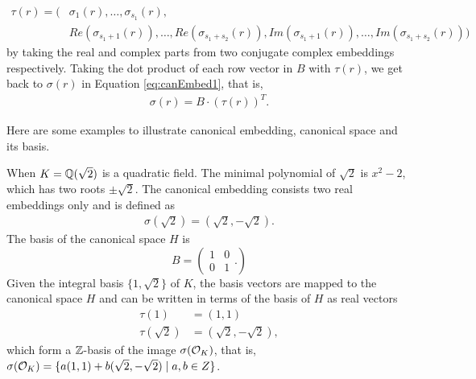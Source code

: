 \documentclass[../main.tex]{subfiles}
\begin{document}
\begin{align}
\label{eq:canEmbed2}
\tau(r) = (&\sigma_1(r), \dots, \sigma_{s_1}(r), \nonumber \\  
&Re(\sigma_{s_1+1}(r)),\dots,Re(\sigma_{s_1+s_2}(r)),Im(\sigma_{s_1+1}(r)),\dots, Im(\sigma_{s_1+s_2}(r)))
\end{align}
by taking the real and complex parts from two conjugate complex embeddings respectively. Taking the dot product of each row vector in $B$ with $\tau(r)$, we get back to $\sigma(r)$ in Equation \ref{eq:canEmbed1}, that is, 
\begin{align*}
    \sigma(r) = B \cdot (\tau(r))^T.
\end{align*}
\iffalse 
To be consistent with the reference books we used, we re-order entries of Equation \ref{eq:canEmbed3} so that 
\begin{align}
\label{eq:canEmbed2}
\sigma(r) = (&\sigma_1(r), \dots, \sigma_{s_1}(r), \nonumber \\  
&Re(\sigma_{s_1+1}(r)),Im(\sigma_{s_1+1}(r)), \dots,
Re(\sigma_{s_1+s_2}(r)),Im(\sigma_{s_1+s_2}(r)))
\end{align}
\fi 


Here are some examples to illustrate canonical embedding, canonical space and its basis. 
\begin{example}
When $K=\mathbb{Q}(\sqrt{2})$ is a quadratic field. The minimal polynomial of $\sqrt{2}$ is $x^2-2$, which has two roots $\pm \sqrt{2}$. The canonical embedding consists two real embeddings only and is defined as 
\begin{align*}
    \sigma(\sqrt{2}) = (\sqrt{2},-\sqrt{2}).
\end{align*}
The basis of the canonical space $H$ is 
\begin{equation*}
B = \left(
    \begin{matrix}
    1 & 0 \\
    0 & 1
    \end{matrix}.
\right)
\end{equation*}
Given the integral basis $\{1,\sqrt{2}\}$ of $K$, the basis vectors are mapped to the canonical space $H$ and can be written in terms of the basis of $H$ as real vectors    
\begin{align*}
    \tau(1) &= (1,1) \\
    \tau(\sqrt{2}) &= (\sqrt{2},-\sqrt{2}),
\end{align*}
which form a $\mathbb{Z}$-basis of the image $\sigma(\mathcal{O}_K)$, that is, $\sigma(\mathcal{O}_K) = \{a(1,1)+b(\sqrt{2},-\sqrt{2}) \mid a, b \in Z\}$.
\end{example}
\end{document}
